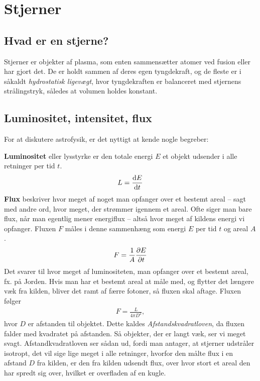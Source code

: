 \documentclass[crop=false, class=memoir]{standalone}
\begin{document}

\chapter{Stjerner}

\section{Hvad er en stjerne?}

Stjerner er objekter af plasma, som enten sammensætter atomer ved fusion eller har gjort det. De er holdt sammen af deres egen tyngdekraft, og de fleste er i såkaldt \emph{hydrostatisk ligevægt}, hvor tyngdekraften er balanceret med stjernens strålingstryk, således at volumen holdes konstant.

\section{Luminositet, intensitet, flux}
For at diskutere astrofysik, er det nyttigt at kende nogle begreber:

\vspace{1em}
\noindent
\textbf{Luminositet} eller lysstyrke er den totale energi $E$ et objekt udsender i alle retninger per tid $t$.
\begin{align}
    L = \dv{E}{t}
\end{align}
\noindent
\textbf{Flux} beskriver hvor meget af noget man opfanger over et bestemt areal -- sagt med andre ord, hvor meget, der strømmer igennem et areal. Ofte siger man bare flux, når man egentlig mener energiflux -- altså hvor meget af kildens energi vi opfanger. Fluxen $F$ måles i denne sammenhæng som energi $E$ per tid $t$ og areal $A$.
\begin{align}
    F=\frac{1}{A}\pdv{E}{t}
\end{align}
Det svarer til hvor meget af luminositeten, man opfanger over et bestemt areal, fx. på Jorden. Hvis man har et bestemt areal at måle med, og flytter det længere væk fra kilden, bliver det ramt af færre fotoner, så fluxen skal aftage. Fluxen følger
\begin{align}
    F=\frac{L}{4\pi D^2}, \label{stjerner:eq:afstandskv}
\end{align}
hvor $D$ er afstanden til objektet. Dette kaldes \emph{Afstandskvadratloven}, da fluxen falder med kvadratet på afstanden. Så objekter, der er langt væk, ser vi meget svagt. Afstandkvadratloven ser sådan ud, fordi man antager, at stjerner udstråler isotropt, det vil sige lige meget i alle retninger, hvorfor den målte flux i en afstand $D$ fra kilden, er den fra kilden udsendt flux, over hvor stort et areal den har spredt sig over, hvilket er overfladen af en kugle.
\end{document}
